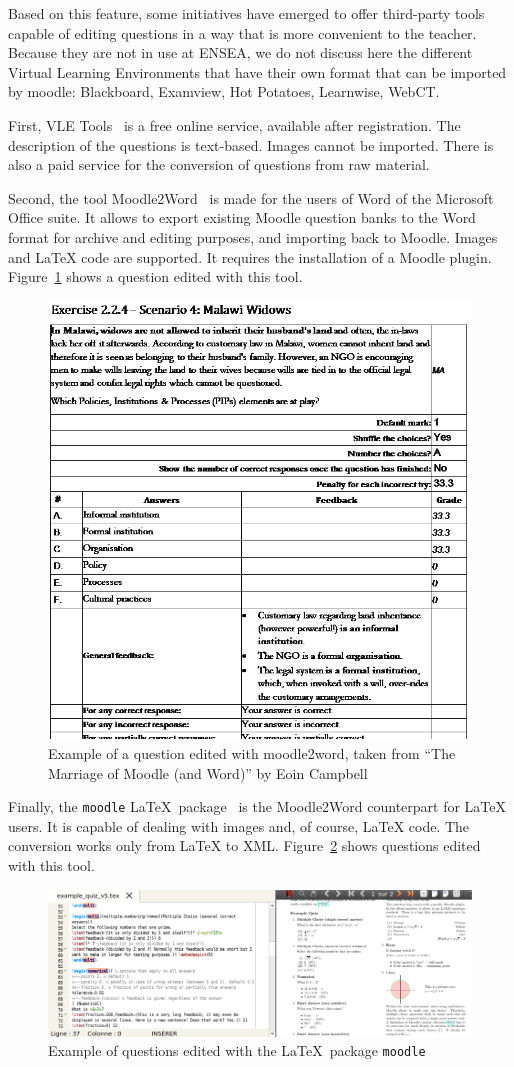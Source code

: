 \documentclass[twocolumn,a4paper,9pt]{article}
\begin{document}
Based on this feature, some initiatives have emerged to offer third-party tools 
capable of editing questions in a way that is more convenient to the teacher. 
Because they are not in use at ENSEA, we do not discuss here the different 
Virtual Learning Environments that have their own format that can be imported 
by moodle: Blackboard, Examview, Hot Potatoes, Learnwise, WebCT.

First, VLE Tools~\cite{vletools} is a free online service, available after 
registration. The description of the questions is text-based. 
Images cannot be imported. There is also a paid service for the conversion of 
questions from raw material.%

Second, the tool Moodle2Word~\cite{moodle2word} is made for 
the users of Word of the Microsoft Office suite. It allows to export existing 
Moodle question banks to the Word format for archive and editing purposes, and 
importing back to Moodle. Images and \LaTeX{} code are supported. It requires 
the installation of a Moodle plugin. Figure~\ref{fig:moodle2word} shows a 
question edited with this tool.

\begin{figure}[tbp]
\centering
\includegraphics[width=.5\textwidth]{moodle2word}
\caption{Example of a question edited with moodle2word, taken from ``The 
Marriage of Moodle (and Word)'' by Eoin Campbell}
\label{fig:moodle2word}
\end{figure}

Finally, the \texttt{moodle} \LaTeX\ package~\cite{latex2moodle} is the 
Moodle2Word counterpart for \LaTeX{} users. It is capable of dealing with 
images and, of course, \LaTeX{} code. The conversion works only from \LaTeX{} 
to XML. Figure~\ref{fig:latex2moodle} shows questions edited with this tool.

\begin{figure}[tbp]
\centering
\includegraphics[width=\textwidth]{latex2moodle}
\caption{Example of questions edited with the \LaTeX\ package \texttt{moodle}}
\label{fig:latex2moodle}
\end{figure}
\end{document}
